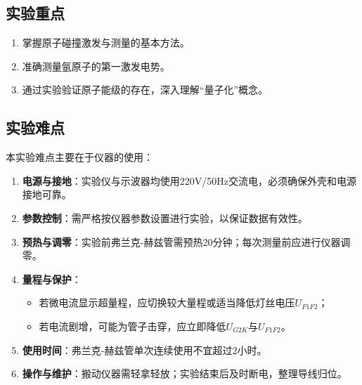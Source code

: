 \documentclass[]{../template/Report}%
\begin{document}
\subsection{实验重点}
\begin{enumerate}
\item 掌握原子碰撞激发与测量的基本方法。
\item 准确测量氩原子的第一激发电势。
\item 通过实验验证原子能级的存在，深入理解“量子化”概念。
\end{enumerate}

\subsection{实验难点}
本实验难点主要在于仪器的使用：
\begin{enumerate}
\item \textbf{电源与接地}：实验仪与示波器均使用220V/50Hz交流电，必须确保外壳和电源接地可靠。
\item \textbf{参数控制}：需严格按仪器参数设置进行实验，以保证数据有效性。
\item \textbf{预热与调零}：实验前弗兰克-赫兹管需预热20分钟；每次测量前应进行仪器调零。
\item \textbf{量程与保护}：
\begin{itemize}
\item 若微电流显示超量程，应切换较大量程或适当降低灯丝电压$U_{F1F2}$；
\item 若电流剧增，可能为管子击穿，应立即降低$U_{G2K}$与$U_{F1F2}$。
\end{itemize}
\item \textbf{使用时间}：弗兰克-赫兹管单次连续使用不宜超过2小时。
\item \textbf{操作与维护}：搬动仪器需轻拿轻放；实验结束后及时断电，整理导线归位。
\end{enumerate}
\end{document}
